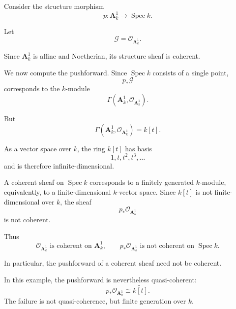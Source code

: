 Consider the structure morphism
\[
p:\mathbf{A}^1_k\longrightarrow \operatorname{Spec} k.
\]

Let
\[
\mathcal{G}=\mathcal{O}_{\mathbf{A}^1_k}.
\]

Since \(\mathbf{A}^1_k\) is affine and Noetherian, its structure sheaf is coherent.

We now compute the pushforward. Since \(\operatorname{Spec} k\) consists of a single point,
\[
p_*\mathcal{G}
\]
corresponds to the \(k\)-module
\[
\Gamma(\mathbf{A}^1_k,\mathcal{O}_{\mathbf{A}^1_k}).
\]

But
\[
\Gamma(\mathbf{A}^1_k,\mathcal{O}_{\mathbf{A}^1_k})
=
k[t].
\]

As a vector space over \(k\), the ring \(k[t]\) has basis
\[
1,t,t^2,t^3,\dots
\]
and is therefore infinite-dimensional.

A coherent sheaf on \(\operatorname{Spec} k\) corresponds to a finitely generated \(k\)-module, equivalently, to a finite-dimensional \(k\)-vector space. Since \(k[t]\) is not finite-dimensional over \(k\), the sheaf
\[
p_*\mathcal{O}_{\mathbf{A}^1_k}
\]
is not coherent.

Thus
\[
\boxed{
	\mathcal{O}_{\mathbf{A}^1_k}\text{ is coherent on }\mathbf{A}^1_k,
	\qquad
	p_*\mathcal{O}_{\mathbf{A}^1_k}\text{ is not coherent on }\operatorname{Spec} k.
}
\]

In particular, the pushforward of a coherent sheaf need not be coherent.

\begin{remark}
	In this example, the pushforward is nevertheless quasi-coherent:
	\[
	p_*\mathcal{O}_{\mathbf{A}^1_k}\cong \widetilde{k[t]}.
	\]
	The failure is not quasi-coherence, but finite generation over \(k\).
\end{remark}

